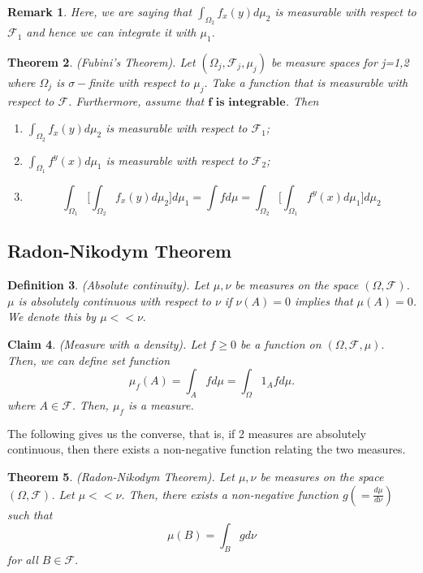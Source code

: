\documentclass[twoside]{article}
\newcounter{lecnum}
\newtheorem{theorem}{Theorem}[lecnum]
\newtheorem{claim}[theorem]{Claim}
\newtheorem{definition}[theorem]{Definition}
\newtheorem{remark}[theorem]{Remark}
\newcommand{\sigmalgebra}{\mathcal{F}}
\begin{document}
\begin{remark}Here, we are saying that $\int_{\Omega_{2}}f_x(y)d\mu_2$ is measurable with respect to $\sigmalgebra_1$ and hence we can integrate it with $\mu_1.$
\end{remark}


\begin{theorem}(Fubini's Theorem). Let $(\Omega_j, \sigmalgebra_j, \mu_j)$ be measure spaces for j=1,2 where $\Omega_j$ is $\sigma-$finite with respect to $\mu_j.$ Take a function that is measurable with respect to $\sigmalgebra$. Furthermore, assume that $\textbf{f is integrable}$. Then 
\begin{enumerate}
\item $\int_{\Omega_{2}}f_x(y)d\mu_2$ is measurable with respect to $\sigmalgebra_1$;
\item $\int_{\Omega_{1}}f^y(x)d\mu_1$ is measurable with respect to $\sigmalgebra_2$;
\item $$
\int_{\Omega_{1}}\bigg[\int_{\Omega_{2}}f_x(y)d\mu_2 \bigg]d\mu_1 = \int fd\mu = \int_{\Omega_{2}}\bigg[\int_{\Omega_{1}}f^y(x)d\mu_1 \bigg]d\mu_2
$$
\end{enumerate}
\end{theorem}

\subsection{Radon-Nikodym Theorem}

\begin{definition}(Absolute continuity). Let $\mu, \nu$ be measures on the space $(\Omega, \sigmalgebra)$. $\mu$ is absolutely continuous with respect to $\nu$ if $\nu(A) = 0$ implies that $\mu(A) = 0$. We denote this by $\mu << \nu.$
\end{definition}

\begin{claim}(Measure with a density).
Let $f \geq 0$ be a function on $(\Omega, \sigmalgebra, \mu).$ Then, we can define set function 
$$
\mu_f(A) = \int_Afd\mu = \int_{\Omega}1_{A}fd\mu.
$$
where $A \in \sigmalgebra$. Then, $\mu_f$ is a measure.
\end{claim}


The following gives us the converse, that is, if 2 measures are absolutely continuous, then there exists a non-negative function relating the two measures.

\begin{theorem}(Radon-Nikodym Theorem). Let $\mu, \nu$ be measures on the space $(\Omega, \sigmalgebra)$. Let $\mu << \nu$. Then, there exists a non-negative function $g ( = \frac{d\mu}{d\nu})$ such that 
$$
\mu(B) = \int_Bgd\nu
$$
for all $B \in \sigmalgebra.$
\end{theorem}
\end{document}
